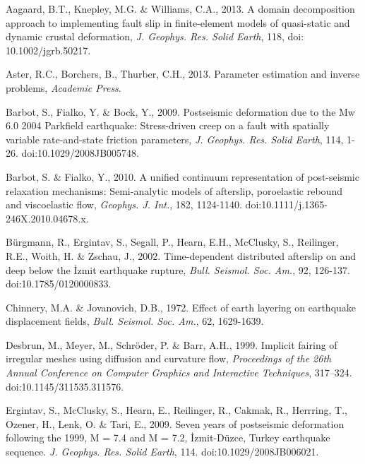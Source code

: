 \documentclass[extra,mreferee]{gji}
\begin{document}
\begin{thebibliography}{}

 Aagaard, B.T., Knepley, M.G. \&
  Williams, C.A., 2013. A domain decomposition approach to
  implementing fault slip in finite-element models of quasi-static and
  dynamic crustal deformation, \textit{J. Geophys.  Res. Solid Earth},
  118, doi: 10.1002/jgrb.50217.

 Aster, R.C., Borchers, B.,
  Thurber, C.H., 2013. Parameter estimation and inverse problems,
  {\textit{Academic Press}}.

 Barbot, S., Fialko, Y. \& Bock,
  Y., 2009. Postseismic deformation due to the Mw 6.0 2004 Parkfield
  earthquake: Stress-driven creep on a fault with spatially variable
  rate-and-state friction parameters, \textit{J. Geophys. Res. Solid
  Earth}, 114, 1-26. doi:10.1029/2008JB005748.

 Barbot, S. \&
  Fialko, Y., 2010. A unified continuum representation of post-seismic
  relaxation mechanisms: Semi-analytic models of afterslip,
  poroelastic rebound and viscoelastic flow, \textit{Geophys. J.
    Int.}, 182, 1124-1140. doi:10.1111/j.1365-246X.2010.04678.x.

 B\"urgmann, R.,
  Ergintav, S., Segall, P., Hearn, E.H., McClusky, S., Reilinger,
  R.E., Woith, H. \& Zschau, J., 2002. Time-dependent distributed
  afterslip on and deep below the \.Izmit earthquake rupture,
  \textit{Bull.  Seismol. Soc. Am.}, 92,
  126-137. doi:10.1785/0120000833.

 Chinnery,
  M.A. \& Jovanovich, D.B., 1972. Effect of earth layering on
  earthquake displacement fields, \textit{Bull. Seismol.  Soc. Am.},
  62, 1629-1639.

 Desbrun, M., Meyer, M.,
  Schr\"oder, P. \& Barr, A.H., 1999.  Implicit fairing of irregular
  meshes using diffusion and curvature flow, \textit{Proceedings of
    the 26th Annual Conference on Computer Graphics and Interactive
    Techniques}, 317–324. doi:10.1145/311535.311576.

 Ergintav, S.,
  McClusky, S., Hearn, E., Reilinger, R., Cakmak, R., Herrring, T.,
  Ozener, H., Lenk, O. \& Tari, E., 2009. Seven years of postseismic
  deformation following the 1999, M = 7.4 and M = 7.2,
  \.Izmit-D\"uzce, Turkey earthquake
  sequence. \textit{J. Geophys. Res. Solid Earth},
  114. doi:10.1029/2008JB006021.


\end{thebibliography}
\end{document}
